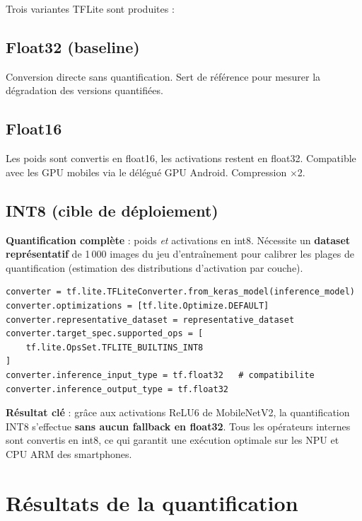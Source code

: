 \documentclass[12pt, a4paper, twoside]{report}
\begin{document}
Trois variantes TFLite sont produites :

\subsection{Float32 (baseline)}

Conversion directe sans quantification. Sert de référence pour mesurer la dégradation des versions quantifiées.

\subsection{Float16}

Les poids sont convertis en float16, les activations restent en float32. Compatible avec les GPU mobiles via le délégué GPU Android. Compression $\times$2.

\subsection{INT8 (cible de déploiement)}

\textbf{Quantification complète} : poids \textit{et} activations en int8. Nécessite un \textbf{dataset représentatif} de 1\,000 images du jeu d'entraînement pour calibrer les plages de quantification (estimation des distributions d'activation par couche).

\begin{lstlisting}[caption={Configuration du convertisseur TFLite INT8.}, label={lst:int8}]
converter = tf.lite.TFLiteConverter.from_keras_model(inference_model)
converter.optimizations = [tf.lite.Optimize.DEFAULT]
converter.representative_dataset = representative_dataset
converter.target_spec.supported_ops = [
    tf.lite.OpsSet.TFLITE_BUILTINS_INT8
]
converter.inference_input_type = tf.float32   # compatibilite
converter.inference_output_type = tf.float32
\end{lstlisting}

\textbf{Résultat clé} : grâce aux activations ReLU6 de MobileNetV2, la quantification INT8 s'effectue \textbf{sans aucun fallback en float32}. Tous les opérateurs internes sont convertis en int8, ce qui garantit une exécution optimale sur les NPU et CPU ARM des smartphones.

\section{Résultats de la quantification}
\end{document}
